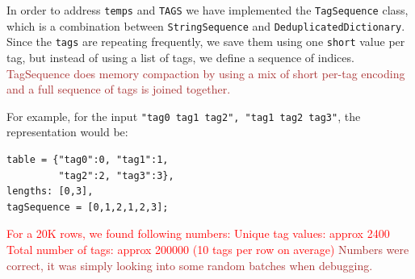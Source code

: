 \documentclass[a4paper,twoside]{article}
\begin{document}
In order to address {\tt temps} and {\tt TAGS} we have implemented the {\tt TagSequence} class, which is a combination between {\tt StringSequence} and {\tt DeduplicatedDictionary}.
Since the {\tt tags} are repeating frequently, we save them using one {\tt short} value per tag, but instead of using a list of tags, we define a sequence of indices.
\textcolor{brown}{
	TagSequence does memory compaction by using a mix of short per-tag encoding and a full sequence of tags is joined together.
}

For example, for the input {\tt "tag0 tag1 tag2", "tag1 tag2 tag3"}, the representation would be:
\begin{verbatim}
table = {"tag0":0, "tag1":1, 
         "tag2":2, "tag3":3},
lengths: [0,3], 
tagSequence = [0,1,2,1,2,3]; 
\end{verbatim}

\textcolor{red}{
For a 20K rows, we found following numbers:
Unique tag values: approx 2400
Total number of tags: approx 200000 (10 tags per row on average)
}
\textcolor{brown}{ Numbers were correct, it was simply looking into some random batches when debugging.
}
\end{document}
